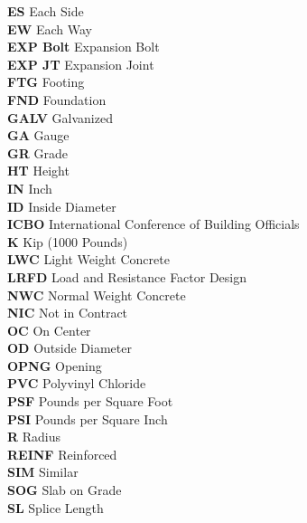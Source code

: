 \begin{tabbing}
    \indent\textbf{ES}       \>  {Each Side}\\
    \indent\textbf{EW}       \>  {Each Way}\\
    \indent\textbf{EXP Bolt} \>  {Expansion Bolt}\\
    \indent\textbf{EXP JT}   \>  {Expansion Joint}\\
    \indent\textbf{FTG}      \>  {Footing}\\
    \indent\textbf{FND}      \>  {Foundation}\\
    \indent\textbf{GALV}     \>  {Galvanized}\\
    \indent\textbf{GA}       \>  {Gauge}\\
    \indent\textbf{GR}       \>  {Grade}\\
    \indent\textbf{HT}       \>  {Height}\\
    \indent\textbf{IN}       \>  {Inch}\\
    \indent\textbf{ID}       \>  {Inside Diameter}\\
    \indent\textbf{ICBO}     \>  {International Conference of Building Officials}\\
    \indent\textbf{K}        \>  {Kip (1000 Pounds)}\\
    \indent\textbf{LWC}      \>  {Light Weight Concrete}\\
    \indent\textbf{LRFD}     \>  {Load and Resistance Factor Design}\\
    \indent\textbf{NWC}      \>  {Normal Weight Concrete}\\
    \indent\textbf{NIC}      \>  {Not in Contract}\\
    \indent\textbf{OC}       \>  {On Center}\\
    \indent\textbf{OD}       \>  {Outside Diameter}\\
    \indent\textbf{OPNG}     \>  {Opening}\\
    \indent\textbf{PVC}      \>  {Polyvinyl Chloride}\\
    \indent\textbf{PSF}      \>  {Pounds per Square Foot}\\
    \indent\textbf{PSI}      \>  {Pounds per Square Inch}\\
    \indent\textbf{R}        \>  {Radius}\\
    \indent\textbf{REINF}    \>  {Reinforced}\\
    \indent\textbf{SIM}      \>  {Similar}\\
    \indent\textbf{SOG}      \>  {Slab on Grade}\\
    \indent\textbf{SL}       \>  {Splice Length}\\

\end{tabbing}
